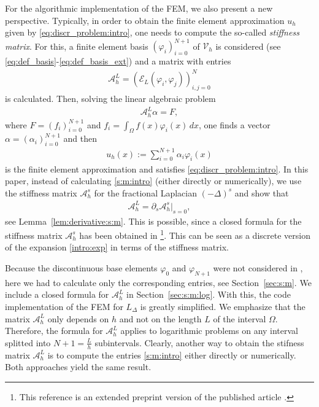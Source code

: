 \documentclass[10 pt]{article}
\numberwithin{equation}{section}
\def\cE{\mathcal{E}}
\begin{document}
 For the algorithmic implementation of the FEM, we also present a new perspective. Typically, in order to obtain the finite element approximation $u_h$ given by \eqref{eq:discr_problem:intro}, one needs to compute the so-called \emph{stiffness matrix}. For this, a finite element basis $(\varphi_i)_{i=0}^{N+1}$ of $\mathcal V_h$ is considered (see \eqref{eq:def_basis}-\eqref{eq:def_basis_ext}) and a matrix with entries
 \begin{align}\label{s:m:intro}
 \mathcal A_{h}^{L}=(\cE_L(\varphi_i,\varphi_j))_{i,j=0}^N
 \end{align}
 is calculated. Then, solving the linear algebraic problem
 \begin{align*}
\mathcal A_{h}^{L}\alpha = F,
 \end{align*}
 where $F=(f_i)_{i=0}^{N+1}$ and $f_i=\int_{\Omega}f(x)\varphi_i(x)\, dx$, one finds a vector $\alpha=(\alpha_i)_{i=0}^{N+1}$ and then
 \begin{align*}
     u_h(x):=\sum_{i=0}^{N+1}\alpha_i \varphi_i(x)
 \end{align*}
 is the finite element approximation and satisfies \eqref{eq:discr_problem:intro}. In this paper, instead of calculating \eqref{s:m:intro} (either directly or numerically), we use the stiffness matrix $\mathcal A_{h}^{s}$ for the fractional Laplacian $(-\Delta)^s$ and show that
 \begin{align*}
 \mathcal A_{h}^{L}=\partial_s \mathcal A_{h}^{s}|_{s=0},
 \end{align*}
 see Lemma~\ref{lem:derivative:s:m}.  This is possible, since a closed formula for the stiffness matrix $\mathcal A_{h}^{s}$ has been obtained in \cite{BH17}\footnote{This reference is an extended preprint version of the published article \cite{BHS19}.}.  This can be seen as a discrete version of the expansion \eqref{intro:exp} in terms of the stiffness matrix.
 
 Because the discontinuous base elements $\varphi_0$ and $\varphi_{N+1}$ were not considered in \cite{BH17}, here we had to calculate only the corresponding entries, see Section~\ref{sec:s:m}.  We include a closed formula for $\mathcal A_{h}^{L}$ in Section~\ref{sec:s:m:log}.  With this, the code implementation of the FEM for $L_\Delta$ is greatly simplified. We emphasize that the matrix $\mathcal A_{h}^{L}$ only depends on $h$ and not on the length $L$ of the interval $\Omega$.  Therefore, the formula for $\mathcal A_{h}^{L}$ applies to logarithmic problems on any interval splitted into $N+1=\frac{L}{h}$ subintervals. Clearly, another way to obtain the stifness matrix $\mathcal A_{h}^{L}$ is to compute the entries \eqref{s:m:intro} either directly or numerically. Both approaches yield the same result. 
\end{document}
